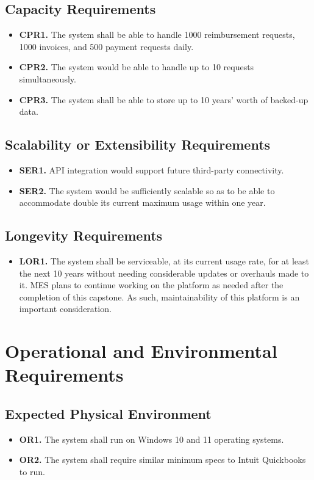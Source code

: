 \documentclass[12pt]{article}
\begin{document}
\subsection{Capacity Requirements}
\begin{itemize}
    \item \textbf{CPR1.} The system shall be able to handle 1000 reimbursement requests, 1000 invoices, and 500 payment requests daily.
    \item \textbf{CPR2.} The system would be able to handle up to 10 requests simultaneously.
    \item \textbf{CPR3.} The system shall be able to store up to 10 years’ worth of backed-up data.
\end{itemize}

\subsection{Scalability or Extensibility Requirements}
\begin{itemize}
    \item \textbf{SER1.} API integration would support future third-party connectivity.
    \item \textbf{SER2.} The system would be sufficiently scalable so as to be able to accommodate double its current maximum usage within one year.
\end{itemize}

\subsection{Longevity Requirements}
\begin{itemize}
    \item \textbf{LOR1.} The system shall be serviceable, at its current usage rate, for at least the next 10 years without needing considerable updates or overhauls made to it. MES plans to continue working on the platform as needed after the completion of this capstone. As such, maintainability of this platform is an important consideration.
\end{itemize}

\section{Operational and Environmental Requirements}
\subsection{Expected Physical Environment}
\begin{itemize}
    \item \textbf{OR1.} The system shall run on Windows 10 and 11 operating systems.
    \item \textbf{OR2.} The system shall require similar minimum specs to Intuit Quickbooks to run.
\end{itemize}
\end{document}
